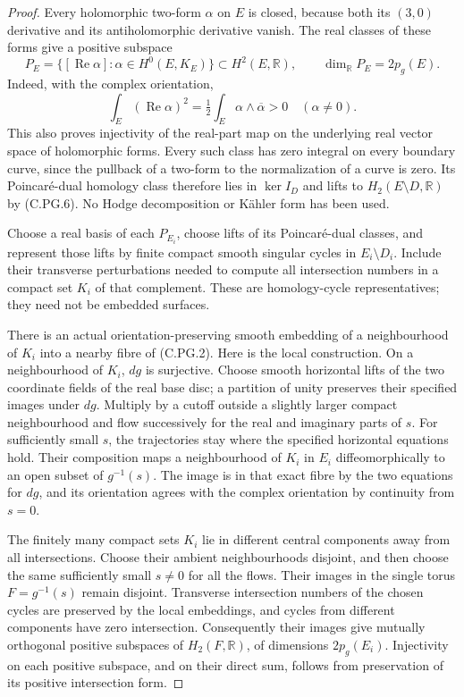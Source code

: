 \begin{proof}
Every holomorphic two-form $\alpha$ on $E$
is closed, because both its $(3,0)$ derivative
and its antiholomorphic derivative vanish.
The real classes of these forms give a
positive subspace
\[
 P_E=\{[\operatorname{Re}\alpha]:
                       \alpha\in H^0(E,K_E)\}
       \subset H^2(E,\mathbb R),
 \qquad \dim_{\mathbb R}P_E=2p_g(E).
                                                               \tag{C.PG.7}
\]
Indeed, with the complex orientation,
\[
 \int_E(\operatorname{Re}\alpha)^2
       =\tfrac12\int_E\alpha\wedge\overline\alpha>0
                      \quad (\alpha\ne0).
                                                               \tag{C.PG.8}
\]
This also proves injectivity of the real-part
map on the underlying real vector space of
holomorphic forms. Every such class has zero
integral on every boundary curve, since the
pullback of a two-form to the normalization
of a curve is zero. Its Poincar\'e-dual
homology class therefore lies in
$\ker I_D$ and lifts to
$H_2(E\setminus D,\mathbb R)$ by (C.PG.6).
No Hodge decomposition or K\"ahler form has
been used.

Choose a real basis of each $P_{E_i}$,
choose lifts of its Poincar\'e-dual classes,
and represent those lifts by finite compact
smooth singular cycles in $E_i\setminus D_i$.
Include their transverse perturbations needed
to compute all intersection numbers in a
compact set $K_i$ of that complement. These
are homology-cycle representatives; they
need not be embedded surfaces.

There is an actual orientation-preserving
smooth embedding of a neighbourhood of
$K_i$ into a nearby fibre of (C.PG.2).
Here is the local construction. On a
neighbourhood of $K_i$, $dg$ is surjective.
Choose smooth horizontal lifts of the two
coordinate fields of the real base disc;
a partition of unity preserves their
specified images under $dg$. Multiply by
a cutoff outside a slightly larger compact
neighbourhood and flow successively for
the real and imaginary parts of $s$.
For sufficiently small $s$, the trajectories
stay where the specified horizontal equations
hold. Their composition maps a neighbourhood
of $K_i$ in $E_i$ diffeomorphically to an
open subset of $g^{-1}(s)$. The image is
in that exact fibre by the two equations
for $dg$, and its orientation agrees with
the complex orientation by continuity
from $s=0$.

The finitely many compact sets $K_i$ lie
in different central components away
from all intersections. Choose their
ambient neighbourhoods disjoint, and
then choose the same sufficiently small
$s\ne0$ for all the flows. Their images
in the single torus $F=g^{-1}(s)$ remain
disjoint. Transverse intersection numbers
of the chosen cycles are preserved by
the local embeddings, and cycles from
different components have zero intersection.
Consequently their images give mutually
orthogonal positive subspaces of
$H_2(F,\mathbb R)$, of dimensions
$2p_g(E_i)$. Injectivity on each positive
subspace, and on their direct sum,
follows from preservation of its positive
intersection form.


\end{proof}
